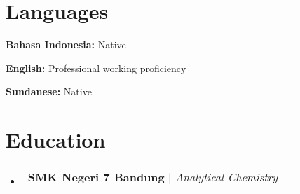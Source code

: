 \documentclass[a4paper, 11pt]{article}
\makeatletter
\newcommand{\resumeProjectHeading}[2]{
    \item
    \begin{tabular*}{0.987\textwidth}{l@{\extracolsep{\fill}}r}
      \small#1\\
    \end{tabular*}\vspace{-7pt}
}
\newcommand{\resumeSubHeadingListStart}{\begin{itemize}[leftmargin=0.1in, label={}]}
\newcommand{\resumeSubHeadingListEnd}{\end{itemize}\vspace{5pt}}
\makeatother
\begin{document}
\section{Languages}
    \resumeSubHeadingListStart
        \small{
            \item \textbf{Bahasa Indonesia:} Native
            \item \textbf{English:} Professional working proficiency
            \item \textbf{Sundanese:} Native
        }
    \resumeSubHeadingListEnd

\section{Education}
    \resumeSubHeadingListStart
        \resumeProjectHeading
            {\textbf{SMK Negeri 7 Bandung} $|$ \emph{Analytical Chemistry}}{2009 -- 2011}
    \resumeSubHeadingListEnd
\end{document}
